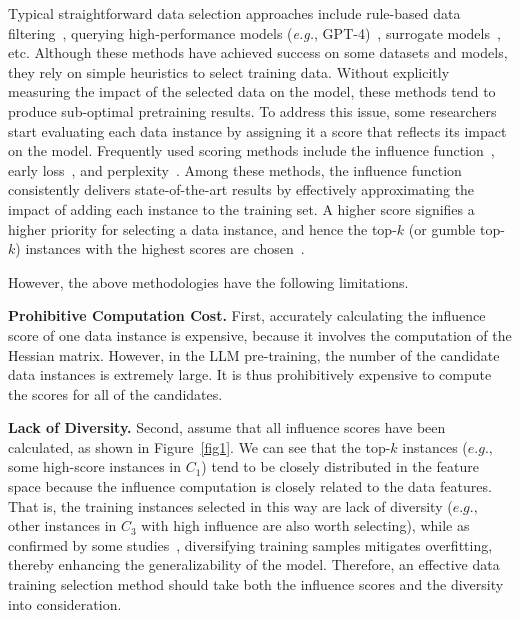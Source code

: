 \documentclass{article} %
\begin{document}
Typical straightforward data selection approaches include rule-based data filtering~\citep{raffel2020exploring, rae2021scaling}, querying high-performance models (\textit{e.g.}, GPT-4)~\citep{wettig2024qurating, sachdeva2024train}, surrogate models~\citep{lin2024rho, shao2024deepseekmath}, etc. Although these methods have achieved success on some datasets and models, they rely on simple heuristics to select training data. Without explicitly measuring the impact of the selected data on the model, these methods tend to produce sub-optimal pretraining results.  
%
To address this issue, some researchers~\citep{xialess, yu2024mates} start evaluating each data instance by assigning it a score that reflects its impact on the model. Frequently used scoring methods include the influence function~\citep{xialess}, early loss~\citep{albalak2023efficient}, and perplexity~\citep{chen2024towards}. Among these methods, the influence function consistently delivers state-of-the-art results by effectively approximating the impact of adding each instance to the training set.
A higher score signifies a higher priority for selecting a data instance, and hence the top-$k$ (or gumble top-$k$) instances with the highest scores are chosen~\citep{xie2023data, wettig2024qurating, yu2024mates}.


However, the above methodologies have the following limitations. 
%

\noindent\textbf{Prohibitive Computation Cost.}
First, accurately calculating the influence score of one data instance is expensive, because it involves the computation of the Hessian matrix. However, in the LLM pre-training, the number of the candidate data instances is extremely large. It is thus prohibitively expensive to compute the scores for all of the candidates. 


\noindent\textbf{Lack of Diversity.}
Second, assume that all influence scores have been calculated, as shown in Figure~\ref{fig1}.  We can see that the top-$k$ instances ($e.g.,$ some high-score instances in $C_1$) tend to be closely distributed in the feature space because the influence computation is closely related to the data features. 
That is, the training instances selected in this way are lack of diversity ($e.g.,$ other instances in $C_3$ with high influence are also worth selecting), while as confirmed by some studies~\citep{abbas2023semdedup, tirumala2023d4}, diversifying training samples mitigates overfitting, thereby enhancing the generalizability of the model.
Therefore, an effective data training selection method should take both the influence scores and the diversity into consideration.
\end{document}
